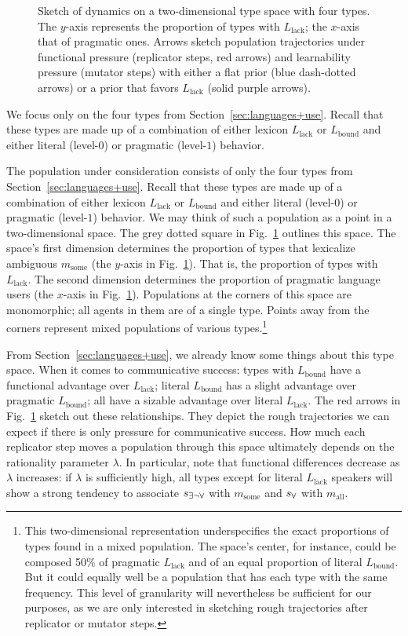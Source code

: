 \documentclass[a4paper, 11pt]{article}
\theoremstyle{Satz}
\newcommand{\state}{\ensuremath{s}\xspace}		%
\newcommand{\mystate}[1]{\ensuremath{\state_{\text{#1}}}\xspace} %
\newcommand{\mylang}[1]{\ensuremath{L_{\text{#1}}}\xspace} %
\newcommand{\messg}{\ensuremath{m}\xspace}		%
\newcommand{\mymessg}[1]{\ensuremath{\messg_{\text{#1}}}\xspace} %
\newcommand{\ssome}{\mystate{\ensuremath{\exists\neg\forall}}}
\newcommand{\sall}{\mystate{\ensuremath{\forall}}}
\newcommand{\msome}{\mymessg{some}}
\newcommand{\mall}{\mymessg{all}}
\newcommand{\Lbound}{\mylang{bound}}
\newcommand{\Llack}{\mylang{lack}}
\begin{document}
\begin{figure}
\caption{Sketch of dynamics on a two-dimensional type space with four types. The $y$-axis
  represents the proportion of types with $\Llack$; the $x$-axis that of pragmatic ones. Arrows
  sketch population trajectories under functional pressure (replicator steps, red arrows) and
  learnability pressure (mutator steps) with either a flat prior (blue dash-dotted arrows) or a
  prior that favors $\Llack$ (solid purple arrows).}
\label{fig:sketch}
\end{figure}

We focus only on the four types from Section~\ref{sec:languages+use}. Recall that these types
are made up of a combination of either lexicon $\Llack$ or $\Lbound$ and either literal
(level-$0$) or pragmatic (level-$1$) behavior.


The population under consideration consists of only the four types from
Section~\ref{sec:languages+use}. Recall that these types are made up of a combination of either
lexicon $\Llack$ or $\Lbound$ and either literal (level-$0$) or pragmatic (level-$1$)
behavior. We may think of such a population as a point in a two-dimensional space. The grey
dotted square in Fig.~\ref{fig:sketch} outlines this space. The space's first dimension
determines the proportion of types that lexicalize ambiguous $\msome$ (the $y$-axis in
Fig.~\ref{fig:sketch}). That is, the proportion of types with $\Llack$. The second dimension
determines the proportion of pragmatic language users (the $x$-axis in
Fig.~\ref{fig:sketch}). Populations at the corners of this space are monomorphic; all agents in
them are of a single type. Points away from the corners represent mixed populations of various
types.\footnote{This two-dimensional representation underspecifies the exact proportions of
  types found in a mixed population. The space's center, for instance, could be composed 50\%
  of pragmatic $\Llack$ and of an equal proportion of literal $\Lbound$. But it could equally
  well be a population that has each type with the same frequency. This level of granularity
  will nevertheless be sufficient for our purposes, as we are only interested in sketching
  rough trajectories after replicator or mutator steps.}

From Section~\ref{sec:languages+use}, we already know some things about this type space. When
it comes to communicative success: types with $\Lbound$ have a functional advantage over
$\Llack$; literal $\Lbound$ has a slight advantage over pragmatic $\Lbound$; all have a sizable
advantage over literal $\Llack$. The red arrows in Fig.~\ref{fig:sketch} sketch out these
relationships. They depict the rough trajectories we can expect if there is only pressure for
communicative success. How much each replicator step moves a population through this space
ultimately depends on the rationality parameter $\lambda$. In particular, note that functional
differences decrease as $\lambda$ increases: if $\lambda$ is sufficiently high, all types
except for literal $\Llack$ speakers will show a strong tendency to associate $\ssome$ with
$\msome$ and $\sall$ with $\mall$. 
\end{document}
